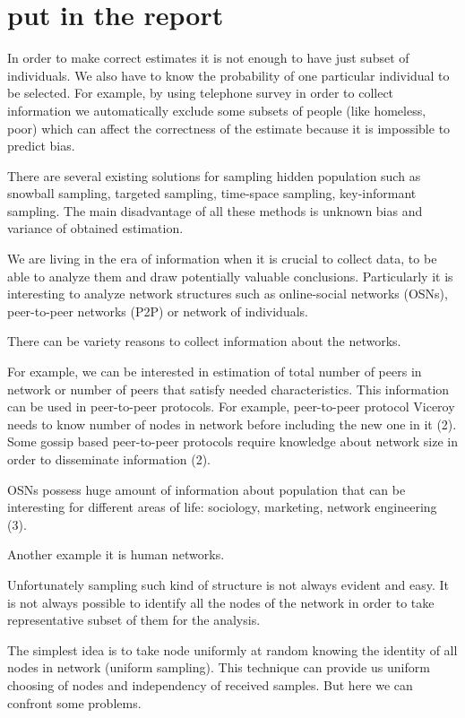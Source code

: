 \documentclass[12pt]{report}
\begin{document}
\section{put in the report}

In order to make correct estimates it is not enough to have just subset of individuals. We also have to know the probability of one particular individual to be selected. For example, by using telephone survey in order to collect information we automatically exclude some subsets of people (like homeless, poor) which can affect the correctness of the estimate because it is impossible to predict bias. 

There are several existing solutions for sampling hidden population such as snowball sampling, targeted sampling, time-space sampling, key-informant sampling. The main disadvantage of all these methods is unknown bias and variance of obtained estimation.

We are living in the era of information when it is crucial to collect data, to be able to analyze them and draw potentially valuable conclusions. Particularly it is interesting to analyze network structures such as online-social networks (OSNs), peer-to-peer networks (P2P) or network of individuals.

There can be variety reasons to collect information about the networks.

For example, we can be interested in estimation of total number of peers in network or number of peers that satisfy needed characteristics. This information can be used in peer-to-peer protocols. For example, peer-to-peer protocol Viceroy needs to know number of nodes in network before including the new one in it (2). Some gossip based peer-to-peer protocols require knowledge about network size in order to disseminate information (2).

OSNs possess huge amount of information about population that can be interesting for different areas of life: sociology, marketing, network engineering (3).

Another example it is human networks.

Unfortunately sampling such kind of structure is not always evident and easy. It is not always possible to identify all the nodes of the network in order to take representative subset of them for the analysis. 


The simplest idea is to take node uniformly at random knowing the identity of all nodes in network (uniform sampling). This technique can provide us uniform choosing of nodes and independency of received samples. But here we can confront some problems.
\end{document}
